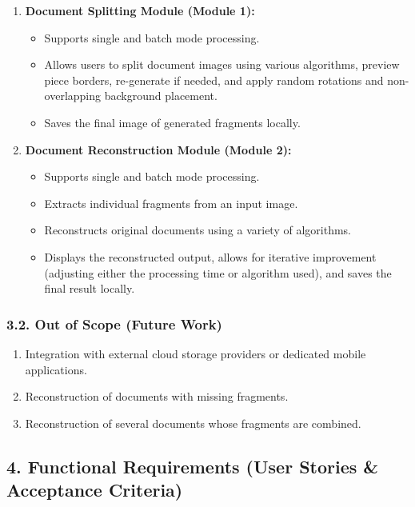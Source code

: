 \documentclass[
]{article}
\providecommand{\tightlist}{%
  \setlength{\itemsep}{0pt}\setlength{\parskip}{0pt}}
\begin{document}
\begin{enumerate}
\def\labelenumi{\arabic{enumi}.}
\tightlist
\item
  \textbf{Document Splitting Module (Module 1):}

  \begin{itemize}
  \tightlist
  \item
    Supports single and batch mode processing.
  \item
    Allows users to split document images using various algorithms,
    preview piece borders, re-generate if needed, and apply random
    rotations and non-overlapping background placement.
  \item
    Saves the final image of generated fragments locally.
  \end{itemize}
\item
  \textbf{Document Reconstruction Module (Module 2):}

  \begin{itemize}
  \tightlist
  \item
    Supports single and batch mode processing.
  \item
    Extracts individual fragments from an input image.
  \item
    Reconstructs original documents using a variety of algorithms.
  \item
    Displays the reconstructed output, allows for iterative improvement
    (adjusting either the processing time or algorithm used), and saves
    the final result locally.
  \end{itemize}
\end{enumerate}

\subsubsection{3.2. Out of Scope (Future
Work)}\label{out-of-scope-future-work}

\begin{enumerate}
\def\labelenumi{\arabic{enumi}.}
\tightlist
\item
  Integration with external cloud storage providers or dedicated mobile
  applications.
\item
  Reconstruction of documents with missing fragments.
\item
  Reconstruction of several documents whose fragments are combined.
\end{enumerate}

\subsection{4. Functional Requirements (User Stories \& Acceptance
Criteria)}\label{functional-requirements-user-stories-acceptance-criteria}
\end{document}

